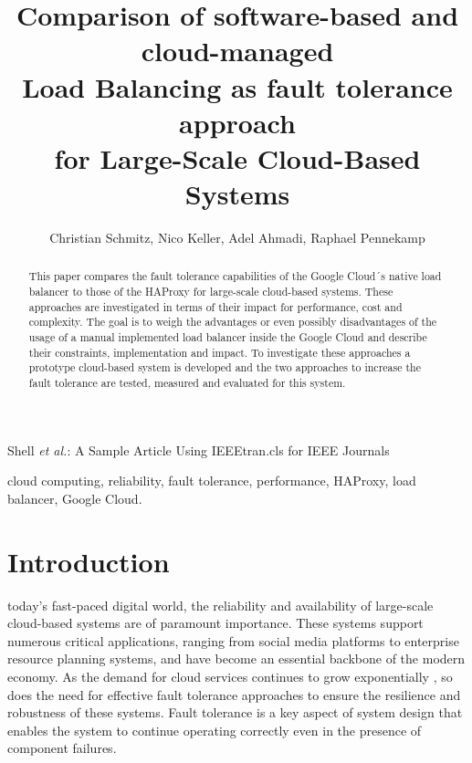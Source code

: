\documentclass[lettersize,journal]{IEEEtran}
\begin{document}
\title{Comparison of software-based and cloud-managed\\ Load Balancing as fault tolerance approach\\ for Large-Scale Cloud-Based Systems}

\author{Christian Schmitz, Nico Keller, Adel Ahmadi, Raphael Pennekamp}

%
{Shell \MakeLowercase{\textit{et al.}}: A Sample Article Using IEEEtran.cls for IEEE Journals}

\maketitle
\begin{abstract}
This paper compares the fault tolerance capabilities of the Google Cloud´s native load balancer to those of the HAProxy for large-scale cloud-based systems. These approaches are investigated in terms of their impact for performance, cost and complexity. The goal is to weigh the advantages or even possibly disadvantages of the usage of a manual implemented load balancer inside the Google Cloud and describe their constraints, implementation and impact. To investigate these approaches a prototype cloud-based system is developed and the two approaches to increase the fault tolerance are tested, measured and evaluated for this system.
\end{abstract}

\begin{IEEEkeywords}
cloud computing, reliability, fault tolerance, performance, HAProxy, load balancer, Google Cloud.
\end{IEEEkeywords}

\section{Introduction} 
  today's fast-paced digital world, the reliability and availability of large-scale cloud-based systems are of paramount importance. These systems support numerous critical applications, ranging from social media platforms to enterprise resource planning systems, and have become an essential backbone of the modern economy. As the demand for cloud services continues to grow exponentially \cite{cloud_demand}, so does the need for effective fault tolerance approaches to ensure the resilience and robustness of these systems. Fault tolerance is a key aspect of system design that enables the system to continue operating correctly even in the presence of component failures.\\
\end{document}

